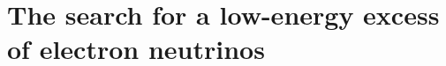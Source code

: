 \chapter{The search for a low-energy excess of electron neutrinos}\label{ch:6-analysis}

\minitoc









